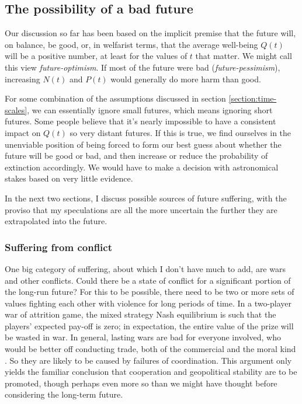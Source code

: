 \documentclass[british]{article}
\begin{document}
\subsection{The possibility of a bad future} Our discussion so far has been based on the implicit premise that the future will, on balance, be good, or, in welfarist terms, that the average well-being \(Q(t)\) will be a positive number, at least for the values of \(t\) that matter. We might call this view \emph{future-optimism}. If most of the future were bad (\emph{future-pessimism}), increasing \(N(t)\) and \(P(t)\) would generally do more harm than good.

For some combination of the assumptions discussed in section \ref{section:time-scales}, we can essentially ignore small futures, which means ignoring short futures. Some people believe that it's nearly impossible to have a consistent impact on $Q(t)$ so very distant futures. If this is true, we find ourselves in the unenviable position of being forced to form our best guess about whether the future will be good or bad, and then increase or reduce the probability of extinction accordingly. We would have to make a decision with astronomical stakes based on very little evidence.

In the next two sections, I discuss possible sources of future suffering, with the proviso that my speculations are all the more uncertain the further they are extrapolated into the future.

\subsubsection{Suffering from conflict}\label{war}
One big category of suffering, about which I don't have much to add, are wars and other conflicts. Could there be a state of conflict for a significant portion of the long-run future? For this to be possible, there need to be two or more sets of values fighting each other with violence for long periods of time. In a two-player war of attrition game, the mixed strategy Nash equilibrium is such that the players' expected pay-off is zero; in expectation, the entire value of the prize will be wasted in war. In general, lasting wars are bad for everyone involved, who would be better off conducting trade, both of the commercial and the moral kind \citep{tomasik_gains_2013,ord_moral_2015}. So they are likely to be caused by failures of coordination. This argument only yields the familiar conclusion that cooperation and geopolitical stability are to be promoted, though perhaps even more so than we might have thought before considering the long-term future.
\end{document}
